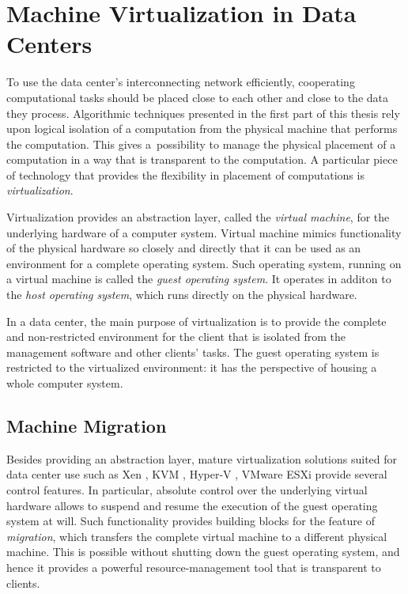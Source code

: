 \section{Machine Virtualization in Data Centers}
\label{sec:intro-machine-virtualization}

To use the data center's interconnecting network efficiently, cooperating computational tasks should be placed close to each other and close to the data they process.
Algorithmic techniques presented in the first part of this thesis rely upon logical isolation of a computation from the physical machine that performs the computation.
This gives a~possibility to manage the physical placement of a computation in a way that is transparent to the computation.
A particular piece of technology that provides the flexibility in placement of computations is \emph{virtualization}.

Virtualization provides an abstraction layer, called the \emph{virtual machine}, for the underlying hardware of a computer system.
Virtual machine mimics functionality of the physical hardware so closely and
directly that it can be used as an environment for a complete operating system.
Such operating system, running on a virtual machine is called the \emph{guest
operating system}. It operates in additon to the \emph{host operating
system}, which runs directly on the physical hardware. 

In a data center, the main purpose of virtualization is to provide the complete and non-restricted environment for the client that is isolated from the management software and other clients' tasks.
The guest operating system is restricted to the virtualized environment: it has the perspective of housing a whole computer system.


\subsection{Machine Migration}

Besides providing an abstraction layer, mature virtualization solutions suited for data center use such as Xen
\cite{url-xen}, KVM \cite{url-kvm}, Hyper-V \cite{url-hyperv}, VMware ESXi
\cite{url-vmware} provide several control features.
In particular, absolute control over the underlying virtual hardware allows to suspend and resume the execution of the guest operating system at will.
Such functionality provides building blocks for the feature of \emph{migration}, which transfers the complete virtual machine to a different physical machine.
This is possible without shutting down the guest operating system, and hence it provides a powerful resource-management tool that is transparent to clients.

